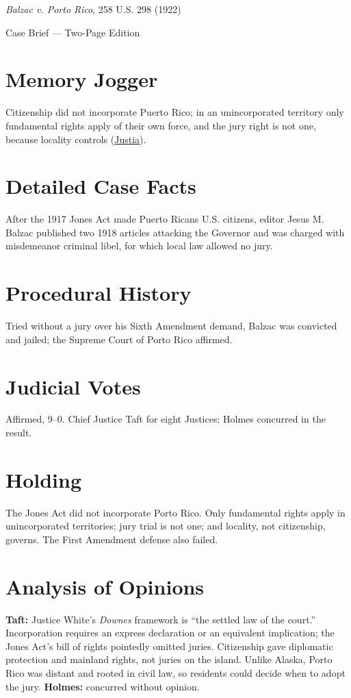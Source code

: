 \documentclass[12pt]{article}
\begin{document}
\begin{center}
{\LARGE \textit{Balzac v. Porto Rico}, 258 U.S. 298 (1922)\par}
\vspace{0.5em}
{\large Case Brief --- Two-Page Edition\par}
\end{center}

\section{Memory Jogger}
Citizenship did not incorporate Puerto Rico; in an unincorporated territory only fundamental rights apply of their own force, and the jury right is not one, because locality controls (\href{https://supreme.justia.com/cases/federal/us/258/298/}{Justia}).

\section{Detailed Case Facts}
After the 1917 Jones Act made Puerto Ricans U.S. citizens, editor Jesus M. Balzac published two 1918 articles attacking the Governor and was charged with misdemeanor criminal libel, for which local law allowed no jury.

\section{Procedural History}
Tried without a jury over his Sixth Amendment demand, Balzac was convicted and jailed; the Supreme Court of Porto Rico affirmed.

\section{Judicial Votes}
Affirmed, 9--0. Chief Justice Taft for eight Justices; Holmes concurred in the result.

\section{Holding}
The Jones Act did not incorporate Porto Rico. Only fundamental rights apply in unincorporated territories; jury trial is not one; and locality, not citizenship, governs. The First Amendment defense also failed.

\section{Analysis of Opinions}
\textbf{Taft:} Justice White's \textit{Downes} framework is ``the settled law of the court.'' Incorporation requires an express declaration or an equivalent implication; the Jones Act's bill of rights pointedly omitted juries. Citizenship gave diplomatic protection and mainland rights, not juries on the island. Unlike Alaska, Porto Rico was distant and rooted in civil law, so residents could decide when to adopt the jury. \textbf{Holmes:} concurred without opinion.
\end{document}
